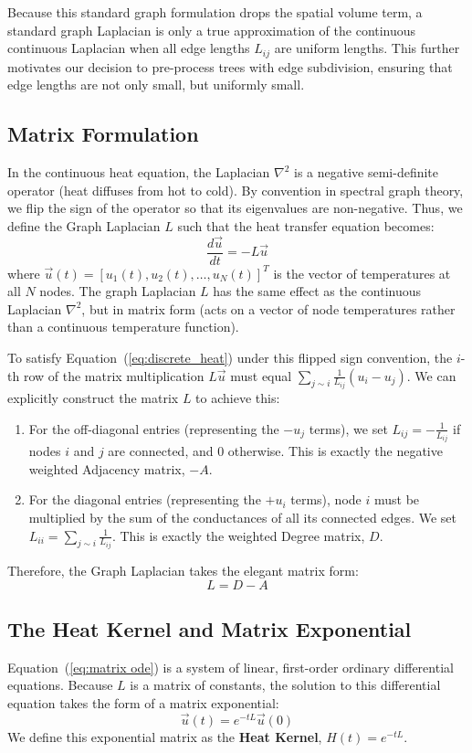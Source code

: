 \documentclass[11pt]{article}
\begin{document}
Because this standard graph formulation drops the spatial volume term, a standard graph Laplacian is only a true approximation of the continuous continuous Laplacian when all edge lengths $L_{ij}$ are uniform lengths. This further motivates our decision to pre-process trees with edge subdivision, ensuring that edge lengths are not only small, but uniformly small.

\subsection{Matrix Formulation}
In the continuous heat equation, the Laplacian $\nabla^2$ is a negative semi-definite operator (heat diffuses from hot to cold). By convention in spectral graph theory, we flip the sign of the operator so that its eigenvalues are non-negative. Thus, we define the Graph Laplacian $L$ such that the heat transfer equation becomes:
\begin{equation}\label{eq:matrix ode}
    \frac{d\vec{u}}{dt} = -L \vec{u}
\end{equation}
where $\vec{u}(t) = {[u_1(t), u_2(t), \dots, u_N(t)]}^T$ is the vector of temperatures at all $N$ nodes. The graph Laplacian $L$ has the same effect as the continuous Laplacian $\nabla^2$, but in matrix form (acts on a vector of node temperatures rather than a continuous temperature function).

To satisfy Equation~(\ref{eq:discrete_heat}) under this flipped sign convention, the $i$-th row of the matrix multiplication $L\vec{u}$ must equal $\sum_{j \sim i} \frac{1}{L_{ij}} (u_i - u_j)$. We can explicitly construct the matrix $L$ to achieve this:
\begin{enumerate}
    \item For the off-diagonal entries (representing the $-u_j$ terms), we set $L_{ij} = -\frac{1}{L_{ij}}$ if nodes $i$ and $j$ are connected, and $0$ otherwise. This is exactly the negative weighted Adjacency matrix, $-A$.
    \item For the diagonal entries (representing the $+u_i$ terms), node $i$ must be multiplied by the sum of the conductances of all its connected edges. We set $L_{ii} = \sum_{j \sim i} \frac{1}{L_{ij}}$. This is exactly the weighted Degree matrix, $D$.
\end{enumerate}
Therefore, the Graph Laplacian takes the elegant matrix form:
\begin{equation}
    L = D - A
\end{equation}

\subsection{The Heat Kernel and Matrix Exponential}
Equation~(\ref{eq:matrix ode}) is a system of linear, first-order ordinary differential equations. Because $L$ is a matrix of constants, the solution to this differential equation takes the form of a matrix exponential:
\begin{equation}
    \vec{u}(t) = e^{-tL} \vec{u}(0)
\end{equation}
We define this exponential matrix as the \textbf{Heat Kernel}, $H(t) = e^{-tL}$. 
\end{document}
